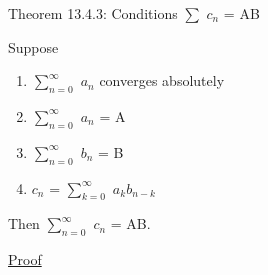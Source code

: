 \newpage

{ \color{red} Theorem 13.4.3: Conditions $\sum$ $c_n$ = AB }

    \hspace{1cm}
    Suppose

    \begin{enumerate}[label=(\alph*), leftmargin=3cm, itemsep=0.1cm]
        \item $\sum_{n=0}^{\infty}$ $a_n$ converges absolutely
        
        \item $\sum_{n=0}^{\infty}$ $a_n$ = A
        
        \item $\sum_{n=0}^{\infty}$ $b_n$ = B
        
        \item $c_n$ = $\sum_{k=0}^{\infty}$ $a_k b_{n-k}$ 
    \end{enumerate}

    \hspace{1cm}
    Then $\sum_{n=0}^{\infty}$ $c_n$ = AB.

{ \color{magenta} \underline{Proof} }

